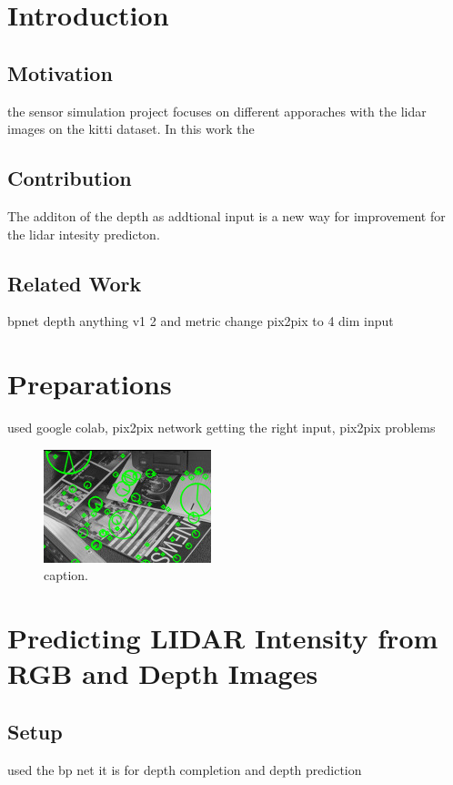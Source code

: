 \chapter{Introduction}
\label{chap:intro}

\section{Motivation}
\label{sect:motivation}
the sensor simulation project focuses on different apporaches with the lidar images on the kitti dataset. In this work the 
\section{Contribution}
The additon of the depth as addtional input is a new way for improvement for the lidar intesity predicton.
\section{Related Work}
bpnet depth anything v1 2 and metric change pix2pix to 4 dim input
\chapter{Preparations}
used google colab, pix2pix network getting the right input, pix2pix problems
\begin{figure}[!ht]
	\centering
	\includegraphics[width=0.9\linewidth]{image.jpg}
	\caption{caption.}
	\label{img:example}
\end{figure}
\chapter{Predicting LIDAR Intensity from RGB and Depth Images}
\section{Setup}
used the bp net it is for depth completion and depth prediction
